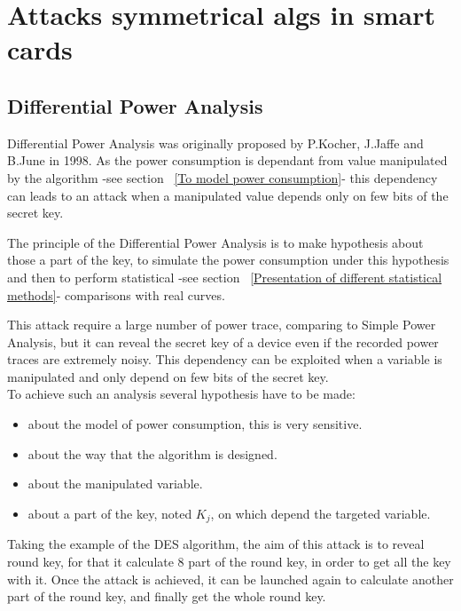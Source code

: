 \newpage
\section{Attacks symmetrical algs in smart cards}

\subsection{Differential Power Analysis} 
\label{Differential_Power_Analysis}

Differential Power Analysis was originally proposed by P.Kocher, 
J.Jaffe and B.June \cite{crypto-1999-kocher} in 1998.
As the power consumption is dependant from value manipulated by the algorithm 
-see section ~\ref{To model power consumption}-
this dependency can leads to an attack when a manipulated value depends only on
few bits of the secret key.

The principle of the Differential Power Analysis is to make hypothesis about those a
part of the key, to simulate the power consumption under this hypothesis and then
to perform statistical 
-see section ~\ref{Presentation of different statistical methods}-
comparisons with real curves. 

This attack require a large number of power trace, comparing to Simple Power Analysis,
but it can reveal the secret key of a device even if the recorded power traces are extremely 
noisy.
This dependency can be exploited when a variable is manipulated and only depend on few bits
of the secret key.\\
To achieve such an analysis several hypothesis have to be made:

\begin{itemize}
	\item  about the model of power consumption, this is very sensitive.
	\item  about the way that the algorithm is designed.
	\item  about the manipulated variable.
	\item  about a part of the key, noted $K_j$, on which depend the targeted variable.
\end{itemize}


Taking the example of the DES algorithm, the aim of this attack is
to reveal round key, for that it calculate 8 part of the round key, 
in order to get all the key with it. 
Once the attack is achieved, it can be launched again to calculate another part of the 
round key, and finally get the whole round key.
\vspace{3mm}

